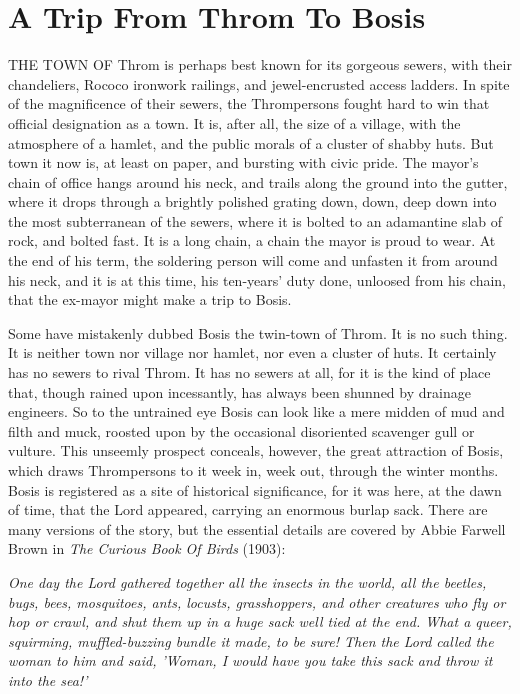 \chapter{A Trip From Throm To Bosis}

THE TOWN OF Throm is perhaps best known for its gorgeous sewers, with their chandeliers, Rococo ironwork railings, and jewel-encrusted access ladders. In spite of the magnificence of their sewers, the Thrompersons fought hard to win that official designation as a town. It is, after all, the size of a village, with the atmosphere of a hamlet, and the public morals of a cluster of shabby huts. But town it now is, at least on paper, and bursting with civic pride. The mayor's chain of office hangs around his neck, and trails along the ground into the gutter, where it drops through a brightly polished grating down, down, deep down into the most subterranean of the sewers, where it is bolted to an adamantine slab of rock, and bolted fast. It is a long chain, a chain the mayor is proud to wear. At the end of his term, the soldering person will come and unfasten it from around his neck, and it is at this time, his ten-years' duty done, unloosed from his chain, that the ex-mayor might make a trip to Bosis.

Some have mistakenly dubbed Bosis the twin-town of Throm. It is no such thing. It is neither town nor village nor hamlet, nor even a cluster of huts. It certainly has no sewers to rival Throm. It has no sewers at all, for it is the kind of place that, though rained upon incessantly, has always been shunned by drainage engineers. So to the untrained eye Bosis can look like a mere midden of mud and filth and muck, roosted upon by the occasional disoriented scavenger gull or vulture. This unseemly prospect conceals, however, the great attraction of Bosis, which draws Thrompersons to it week in, week out, through the winter months. Bosis is registered as a site of historical significance, for it was here, at the dawn of time, that the Lord appeared, carrying an enormous burlap sack. There are many versions of the story, but the essential details are covered by Abbie Farwell Brown in \emph{The Curious Book Of Birds} (1903):

\emph{One day the Lord gathered together all the insects in the world, all the beetles, bugs, bees, mosquitoes, ants, locusts, grasshoppers, and other creatures who fly or hop or crawl, and shut them up in a huge sack well tied at the end. What a queer, squirming, muffled-buzzing bundle it made, to be sure! Then the Lord called the woman to him and said, 'Woman, I would have you take this sack and throw it into the sea!'}

